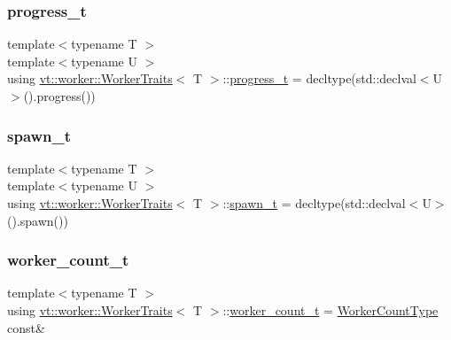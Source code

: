 \subsubsection{\texorpdfstring{progress\+\_\+t}{progress\_t}}
{\footnotesize\ttfamily template$<$typename T $>$ \\
template$<$typename U $>$ \\
using \hyperlink{structvt_1_1worker_1_1_worker_traits}{vt\+::worker\+::\+Worker\+Traits}$<$ T $>$\+::\hyperlink{structvt_1_1worker_1_1_worker_traits_a0cda24a5c8ac86e6877aaa24b23034fd}{progress\+\_\+t} =  decltype(std\+::declval$<$U$>$().progress())}

\mbox{\label{structvt_1_1worker_1_1_worker_traits_ab1c6768c82bad9bb5a911b5a676788a3}} 
\subsubsection{\texorpdfstring{spawn\+\_\+t}{spawn\_t}}
{\footnotesize\ttfamily template$<$typename T $>$ \\
template$<$typename U $>$ \\
using \hyperlink{structvt_1_1worker_1_1_worker_traits}{vt\+::worker\+::\+Worker\+Traits}$<$ T $>$\+::\hyperlink{structvt_1_1worker_1_1_worker_traits_ab1c6768c82bad9bb5a911b5a676788a3}{spawn\+\_\+t} =  decltype(std\+::declval$<$U$>$().spawn())}

\mbox{\label{structvt_1_1worker_1_1_worker_traits_af8f4b5fb160922a2d259889c19ef9ad5}} 
\subsubsection{\texorpdfstring{worker\+\_\+count\+\_\+t}{worker\_count\_t}}
{\footnotesize\ttfamily template$<$typename T $>$ \\
using \hyperlink{structvt_1_1worker_1_1_worker_traits}{vt\+::worker\+::\+Worker\+Traits}$<$ T $>$\+::\hyperlink{structvt_1_1worker_1_1_worker_traits_af8f4b5fb160922a2d259889c19ef9ad5}{worker\+\_\+count\+\_\+t} =  \hyperlink{namespacevt_aa93398ea48f2cb6c188512250f7cc248}{Worker\+Count\+Type} const\&}

